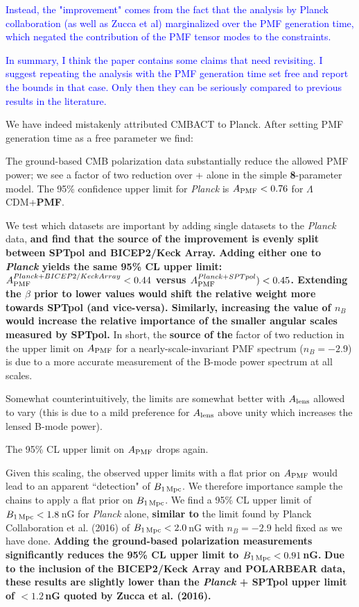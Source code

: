 \documentclass{article}
\newcommand{\apmf}{\ensuremath{A_{\rm PMF}}}
\newcommand{\bpmf}{\ensuremath{B_{\rm 1\,Mpc}}}
\newcommand{\alens}{\ensuremath{A_{\rm lens}}}
\newcommand{\lcdm}{\ensuremath{\Lambda}CDM}
\newcommand{\planck}{{\sl Planck}}
\newcommand{\bicepkeck}{BICEP2/Keck Array}
\newcommand{\sptpol}{SPTpol}
\newcommand{\added}[1]{\textbf{#1}}
\newcommand{\reviewer}[1]{\textcolor{Blue}{#1}}
\newcommand{\diff}[1]{\textcolor{PineGreen}{#1}}
\begin{document}
\reviewer{Instead, the "improvement" comes from the fact that the analysis by Planck collaboration (as well as Zucca et al) marginalized over the PMF generation time, which negated the contribution of the PMF tensor modes to the constraints.}

\reviewer{In summary, I think the paper contains some claims that need revisiting. I suggest repeating the analysis with the PMF generation time set free and report the bounds in that case. Only then they can be seriously compared to previous results in the literature.}

We have indeed mistakenly attributed CMBACT to Planck. After setting PMF generation time as a free parameter we find:

\diff{The ground-based CMB polarization data  substantially reduce the allowed PMF power; we see a factor of two reduction over \plan+{} alone in the simple \added{8}-parameter model. 
The 95\% confidence upper limit for \planck{} is $\apmf <  \upperAplk$ for \lcdm{}+\added{PMF}. }

\diff{We test which datasets are important by adding single datasets to the \planck{} data, \added{and find that the source of the improvement is evenly split between \sptpol{} and \bicepkeck{}.
	Adding either one to \planck{} yields the same 95\% CL upper limit: $\apmf^{\planck+\bicepkeck} <  \upperAbicep$ versus  $\apmf^{\planck+\sptpol}) < \upperAsptpol$. 
	Extending the $\beta$ prior to lower values would shift the relative weight more towards \sptpol{} (and vice-versa). 
	Similarly, increasing the value of $n_B$ would  increase the relative importance of the smaller angular scales measured by \sptpol.}
In short, the \added{source of the} factor of two reduction in the upper limit on \apmf{} for a nearly-scale-invariant PMF spectrum ($n_B=-2.9$) is due to a more accurate measurement of the B-mode power spectrum at all scales.}

\diff{Somewhat counterintuitively, the limits are somewhat better with \alens{} allowed to vary (this is due to a mild preference for \alens{} above unity which increases the lensed B-mode power). }

\diff{The 95\% CL upper limit on \apmf{} drops again.}

\diff{Given this scaling, the observed upper limits with a flat prior on \apmf{} would lead to an apparent ``detection" of \bpmf. 
We therefore importance sample the chains to apply a flat prior on \bpmf. 
We find a 95\% CL upper limit of $\bpmf < \upperBplk$\,nG for \planck{} alone,
\added{similar to} the limit found by Planck Collaboration et al. (2016) of $\bpmf < 2.0$\,nG with $n_B=-2.9$ held fixed as we have done. 
\added{Adding the ground-based polarization measurements significantly reduces the 95\% CL upper limit to $\bpmf < \upperBall$\,nG. }
\added{Due to the inclusion of the \bicepkeck{} and POLARBEAR data, these results are slightly lower than the \planck{} + \sptpol{} upper limit of $<1.2\,$nG quoted by Zucca et al. (2016).}}
\end{document}
